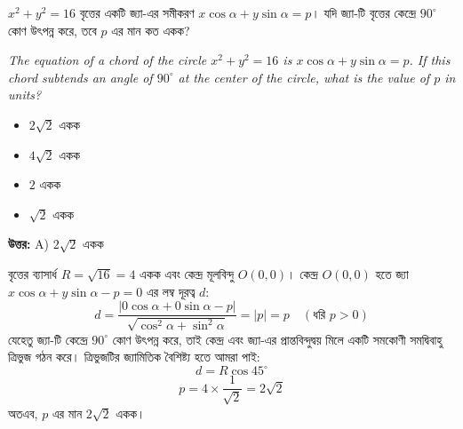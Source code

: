\documentclass[12pt, a4paper]{article}
\begin{document}
\begin{tcolorbox}[questionbox={প্রশ্ন (Question) 8}]
    \noindent
    $x^2 + y^2 = 16$ বৃত্তের একটি জ্যা-এর সমীকরণ $x\cos\alpha + y\sin\alpha = p$। যদি জ্যা-টি বৃত্তের কেন্দ্রে $90^{\circ}$ কোণ উৎপন্ন করে, তবে $p$ এর মান কত একক?
    
    \vspace{0.8em}
    \begin{english}
    \noindent\textit{\color{darkgray}
    The equation of a chord of the circle $x^2 + y^2 = 16$ is $x\cos\alpha + y\sin\alpha = p$. If this chord subtends an angle of $90^{\circ}$ at the center of the circle, what is the value of $p$ in units?
    }
    \end{english}
\end{tcolorbox}

\begin{itemize}[label={}, leftmargin=1cm, itemsep=0.5em]
    \item[\textbf{A)}] $2\sqrt{2}$ একক
    \item[\textbf{B)}] $4\sqrt{2}$ একক
    \item[\textbf{C)}] $2$ একক
    \item[\textbf{D)}] $\sqrt{2}$ একক
\end{itemize}

\vspace{0.5em}
\begin{tcolorbox}[answerbox]
    \textbf{\color{success} উত্তর:} A) $2\sqrt{2}$ একক
\end{tcolorbox}
\vspace{1em}

\begin{tcolorbox}[solutionbox={সমাধান (Solution)}]
    \noindent
    বৃত্তের ব্যাসার্ধ $R = \sqrt{16} = 4$ একক এবং কেন্দ্র মূলবিন্দু $O(0, 0)$। কেন্দ্র $O(0, 0)$ হতে জ্যা $x\cos\alpha + y\sin\alpha - p = 0$ এর লম্ব দূরত্ব $d$:
    \[ d = \frac{|0\cos\alpha + 0\sin\alpha - p|}{\sqrt{\cos^2\alpha + \sin^2\alpha}} = |p| = p \quad (\text{ধরি } p > 0) \]
    যেহেতু জ্যা-টি কেন্দ্রে $90^{\circ}$ কোণ উৎপন্ন করে, তাই কেন্দ্র এবং জ্যা-এর প্রান্তবিন্দুদ্বয় মিলে একটি সমকোণী সমদ্বিবাহু ত্রিভুজ গঠন করে। ত্রিভুজটির জ্যামিতিক বৈশিষ্ট্য হতে আমরা পাই:
    \[ d = R \cos 45^{\circ} \]
    \[ p = 4 \times \frac{1}{\sqrt{2}} = 2\sqrt{2} \]
    অতএব, $p$ এর মান $2\sqrt{2}$ একক।
\end{tcolorbox}
\end{document}
